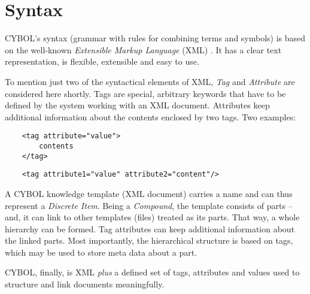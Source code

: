 %
%
%
%
%
%

\section{Syntax}
\label{syntax_heading}

CYBOL's syntax (grammar with rules for combining terms and symbols) is based on
the well-known \emph{Extensible Markup Language} (XML) \cite{xml}. It has a
clear text representation, is flexible, extensible and easy to use.

To mention just two of the syntactical elements of XML, \emph{Tag} and
\emph{Attribute} are considered here shortly. Tags are special, arbitrary
keywords that have to be defined by the system working with an XML document.
Attributes keep additional information about the contents enclosed by two tags.
Two examples:

\begin{scriptsize}
    \begin{verbatim}
    <tag attribute="value">
        contents
    </tag>
    \end{verbatim}
\end{scriptsize}

\begin{scriptsize}
    \begin{verbatim}
    <tag attribute1="value" attribute2="content"/>
    \end{verbatim}
\end{scriptsize}

A CYBOL knowledge template (XML document) carries a name and can thus represent
a \emph{Discrete Item}. Being a \emph{Compound}, the template consists of parts
-- and, it can link to other templates (files) treated as its parts. That way,
a whole hierarchy can be formed. Tag attributes can keep additional information
about the linked parts. Most importantly, the hierarchical structure is based
on tags, which may be used to store meta data about a part.

CYBOL, finally, is XML \emph{plus} a defined set of tags, attributes and values
used to structure and link documents meaningfully.
